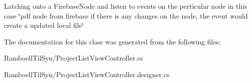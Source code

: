 Latching onto a Firebase\+Node and listen to events on the perticular node in this case \char`\"{}pdf node from firebase if there is any changes on the node, the event would create a updated local file\char`\"{} 



The documentation for this class was generated from the following files\+:\begin{DoxyCompactItemize}
\item 
Ramboell\+Til\+Syn/Project\+List\+View\+Controller.\+cs\item 
Ramboell\+Til\+Syn/Project\+List\+View\+Controller.\+designer.\+cs\end{DoxyCompactItemize}
